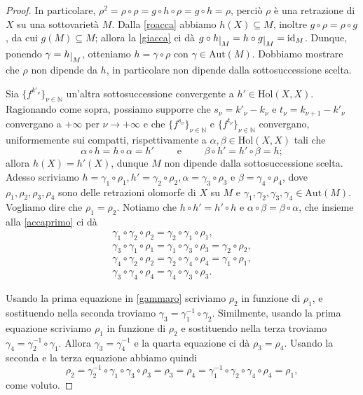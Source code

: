 \begin{proof}
    In particolare, $\rho^2=\rho\circ\rho=g\circ h\circ\rho=g\circ h=\rho$, perciò $\rho$ è una retrazione di $X$ su una sottovarietà $M$. Dalla \eqref{roacca} abbiamo $h(X)\subseteq M$, inoltre $g\circ\rho=\rho\circ g$, da cui $g(M)\subseteq M$; allora la \eqref{giacca} ci dà $g\circ h\restrict{M}=h\circ g\restrict{M}=\id_M$. Dunque, ponendo $\gamma=h\restrict{M}$, otteniamo $h=\gamma\circ\rho$ con $\gamma\in\text{Aut}(M)$. Dobbiamo mostrare che $\rho$ non dipende da $h$, in particolare non dipende dalla sottosuccessione scelta.

    Sia $\{f^{k'_\nu}\}_{\nu\in\mathbb{N}}$ un'altra sottosuccessione convergente a $h'\in\text{Hol}(X,X)$. Ragionando come sopra, possiamo supporre che $s_\nu=k'_\nu-k_\nu$ e $t_\nu=k_{\nu+1}-k'_\nu$ convergano a $+\infty$ per $\nu\longrightarrow+\infty$ e che $\{f^{s_\nu}\}_{\nu\in\mathbb{N}}$ e $\{f^{t_\nu}\}_{\nu\in\mathbb{N}}$ convergano, uniformemente sui compatti, rispettivamente a $\alpha,\beta \in \text{Hol}(X,X)$ tali che
    \begin{equation}\label{accaprimo}
        \alpha\circ h=h\circ\alpha=h' \qquad\text{ e }\qquad \beta\circ h'=h'\circ\beta=h;
    \end{equation}
    allora $h(X)=h'(X)$, dunque $M$ non dipende dalla sottosuccessione scelta. Adesso scriviamo $h=\gamma_1\circ\rho_1,h'=\gamma_2\circ\rho_2,\alpha=\gamma_3\circ\rho_3$ e $\beta=\gamma_4\circ\rho_4$, dove $\rho_1,\rho_2,\rho_3,\rho_4$ sono delle retrazioni olomorfe di $X$ su $M$ e $\gamma_1,\gamma_2,\gamma_3,\gamma_4\in\text{Aut}(M)$. Vogliamo dire che $\rho_1=\rho_2$. Notiamo che $h\circ h'=h'\circ h$ e $\alpha\circ\beta=\beta\circ\alpha$, che insieme alla \eqref{accaprimo} ci dà
    \begin{equation}\label{gammaro}\begin{split}
        \gamma_1\circ\gamma_2\circ\rho_2=\gamma_2\circ\gamma_1\circ\rho_1,\\
        \gamma_3\circ\gamma_1\circ\rho_1=\gamma_1\circ\gamma_3\circ\rho_3=\gamma_2\circ\rho_2,\\
        \gamma_4\circ\gamma_2\circ\rho_2=\gamma_2\circ\gamma_4\circ\rho_4=\gamma_1\circ\rho_1,\\
        \gamma_3\circ\gamma_4\circ\rho_4=\gamma_4\circ\gamma_3\circ\rho_3.
    \end{split}\end{equation}

    Usando la prima equazione in \eqref{gammaro} scriviamo $\rho_2$ in funzione di $\rho_1$, e sostituendo nella seconda troviamo $\gamma_3=\gamma_1^{-1}\circ\gamma_2$. Similmente, usando la prima equazione scriviamo $\rho_1$ in funzione di $\rho_2$ e sostituendo nella terza troviamo $\gamma_4=\gamma_2^{-1}\circ\gamma_1$. Allora $\gamma_3=\gamma_4^{-1}$ e la quarta equazione ci dà $\rho_3=\rho_4$. Usando la seconda e la terza equazione abbiamo quindi
    $$\rho_2=\gamma_2^{-1}\circ\gamma_1\circ\gamma_3\circ\rho_3=\rho_3=\rho_4=\gamma_1^{-1}\circ\gamma_2\circ\gamma_4\circ\rho_4=\rho_1,$$
    come voluto.


\end{proof}
